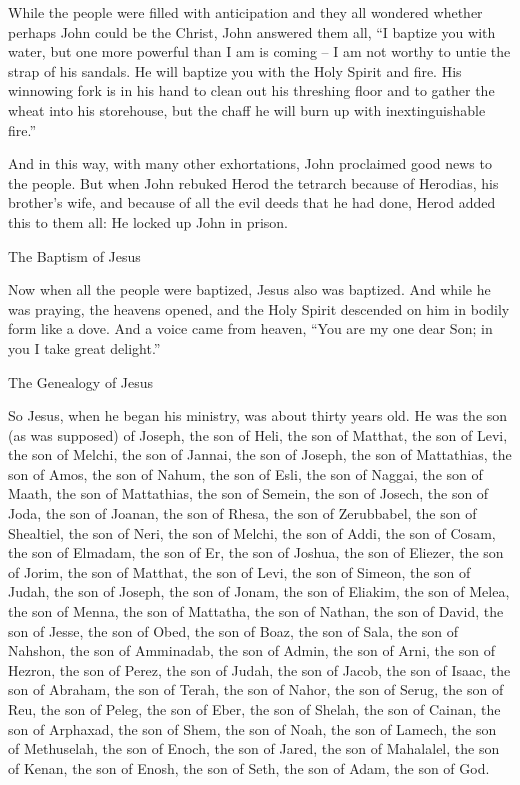 {\par }{\PP {}While
the people
were filled with anticipation
and they
all
wondered
whether
perhaps
John
could be
the Christ,
John
answered
them all, “I
baptize
you
with water,
but
one more powerful than
I
am is coming
– I am
not
worthy
to untie
the strap
of his
sandals.
He
will baptize
you
with
the Holy
Spirit
and
fire.
His winnowing fork
is in
his
hand
to clean out
his
threshing floor
and
to gather
the wheat
into
his
storehouse,
but
the chaff
he will burn up
with inextinguishable
fire.”
\par }{\PP {}And
in this way,
with many
other
exhortations,
John proclaimed good news
to the people.
But
when John
rebuked
Herod
the tetrarch
because of
Herodias,
his
brother’s
wife,
and
because of
all
the evil deeds
that
he
had done,
Herod added
this
to
them all: He locked up
John
in
prison.
\par }{\SH The Baptism of Jesus
\par }{\PP {}Now when all
the people
were baptized,
Jesus
also
was baptized.
And
while he was praying,
the heavens
opened,
and
the Holy
Spirit
descended
on
him
in bodily
form
like
a dove.
And
a voice
came
from
heaven,
“You
are
my
one dear
Son;
in
you
I take great delight.”
\par }{\SH The Genealogy of Jesus
\par }{\PP {}So
Jesus,
when he
began
his ministry, was
about
thirty
years old.
He was
the son
(as
was supposed) of Joseph,
the son of Heli,
the son of Matthat,
the son of Levi,
the son of Melchi,
the son of Jannai,
the son of Joseph,
the son of Mattathias,
the son of Amos,
the son of Nahum,
the son of Esli,
the son of Naggai,
the son of Maath,
the son of Mattathias,
the son of Semein,
the son of Josech,
the son of Joda,
the son of Joanan,
the son of Rhesa,
the son of Zerubbabel,
the son of Shealtiel,
the son of Neri,
the son of Melchi,
the son of Addi,
the son of Cosam,
the son of Elmadam,
the son of Er,
the son of Joshua,
the son of Eliezer,
the son of Jorim,
the son of Matthat,
the son of Levi,
the son of Simeon,
the son of Judah,
the son of Joseph,
the son of Jonam,
the son of Eliakim,
the son of Melea,
the son of Menna,
the son of Mattatha,
the son of Nathan,
the son of David,
the son of Jesse,
the son of Obed,
the son of Boaz,
the son of Sala,
the son of Nahshon,
the son of Amminadab, the son of Admin,
the son of Arni,
the son of Hezron,
the son of Perez,
the son of Judah,
the son of Jacob,
the son of Isaac,
the son of Abraham,
the son of Terah,
the son of Nahor,
the son of Serug,
the son of Reu,
the son of Peleg,
the son of Eber,
the son of Shelah,
the son of Cainan,
the son of Arphaxad,
the son of Shem,
the son of Noah,
the son of Lamech,
the son of Methuselah,
the son of Enoch,
the son of Jared,
the son of Mahalalel,
the son of Kenan,
the son of Enosh,
the son of Seth,
the son of Adam,
the son of God.

}
